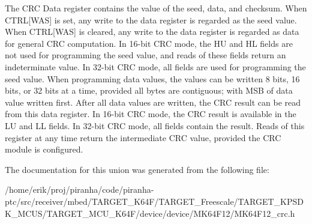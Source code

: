 The C\+RC Data register contains the value of the seed, data, and checksum. When C\+T\+RL\mbox{[}W\+AS\mbox{]} is set, any write to the data register is regarded as the seed value. When C\+T\+RL\mbox{[}W\+AS\mbox{]} is cleared, any write to the data register is regarded as data for general C\+RC computation. In 16-\/bit C\+RC mode, the HU and HL fields are not used for programming the seed value, and reads of these fields return an indeterminate value. In 32-\/bit C\+RC mode, all fields are used for programming the seed value. When programming data values, the values can be written 8 bits, 16 bits, or 32 bits at a time, provided all bytes are contiguous; with M\+SB of data value written first. After all data values are written, the C\+RC result can be read from this data register. In 16-\/bit C\+RC mode, the C\+RC result is available in the LU and LL fields. In 32-\/bit C\+RC mode, all fields contain the result. Reads of this register at any time return the intermediate C\+RC value, provided the C\+RC module is configured. 

The documentation for this union was generated from the following file\+:\begin{DoxyCompactItemize}
\item 
/home/erik/proj/piranha/code/piranha-\/ptc/src/receiver/mbed/\+T\+A\+R\+G\+E\+T\+\_\+\+K64\+F/\+T\+A\+R\+G\+E\+T\+\_\+\+Freescale/\+T\+A\+R\+G\+E\+T\+\_\+\+K\+P\+S\+D\+K\+\_\+\+M\+C\+U\+S/\+T\+A\+R\+G\+E\+T\+\_\+\+M\+C\+U\+\_\+\+K64\+F/device/device/\+M\+K64\+F12/M\+K64\+F12\+\_\+crc.\+h\end{DoxyCompactItemize}
